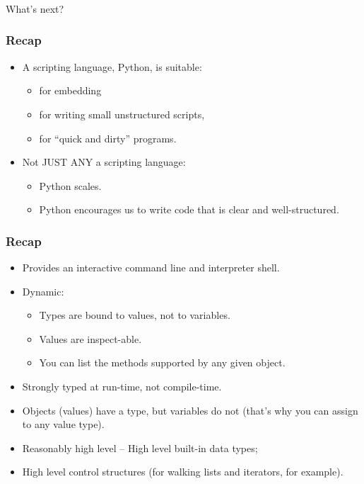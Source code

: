 \begin{frame}[fragile]\frametitle{}
\begin{center}
{\Large What's next?}
\end{center}
\end{frame}

\begin{frame}\frametitle{Recap}

\begin{itemize}
\item A scripting language, Python, is suitable:
	\begin{itemize}
	\item for embedding
	\item for writing small unstructured scripts,
	\item for ``quick and dirty'' programs.
	\end{itemize}
\item Not JUST ANY a scripting language:
	\begin{itemize}
	\item Python scales.
	\item Python encourages us to write code that is clear and well-structured.
	\end{itemize}
\end{itemize}
\end{frame}

\begin{frame}\frametitle{Recap}

\begin{itemize}
\item Provides an interactive command line and interpreter shell.
\item Dynamic:
	\begin{itemize}
	\item Types are bound to values, not to variables.
	\item Values are inspect-able.
	\item You can list the methods supported by any given object.
	\end{itemize}
\item Strongly typed at run-time, not compile-time. 
\item Objects (values) have a type, but variables do not (that's why you can assign to any value type).
\item Reasonably high level -- High level built-in data types; 
\item High level control structures (for walking lists and iterators, for example).
\end{itemize}
\end{frame}

